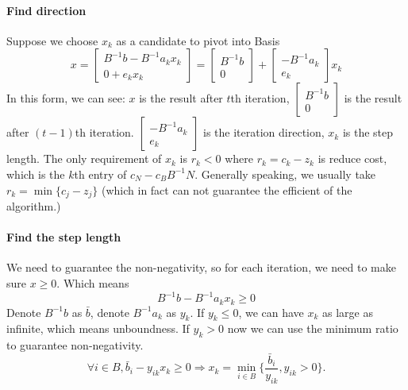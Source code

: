             \paragraph{Find direction}
                Suppose we choose $x_k$ as a candidate to pivot into Basis\\
                \begin{equation}
                    x = \left[ \begin{matrix}B^{-1}b-B^{-1}a_kx_k \\ 0+e_kx_k\end{matrix}\right]=\left[ \begin{matrix}B^{-1}b \\ 0\end{matrix} \right] + \left[ \begin{matrix} -B^{-1}a_k \\ e_k \end{matrix} \right]x_k \nonumber
                \end{equation}
                In this form, we can see: $x$ is the result after $t$th iteration, $\left[ \begin{matrix}B^{-1}b \\ 0\end{matrix} \right]$ is the result after $(t-1)$th iteration. $ \left[ \begin{matrix} -B^{-1}a_k \\ e_k \end{matrix} \right]$ is the iteration direction, $x_k$ is the step length. The only requirement of $x_k$ is $r_k < 0$ where $r_k=c_k - z_k$ is reduce cost, which is the $k$th entry of $c_N - c_BB^{-1}N$. Generally speaking, we usually take $r_k = \min\{c_j - z_j\}$ (which in fact can not guarantee the efficient of the algorithm.)

            \paragraph{Find the step length}
                We need to guarantee the non-negativity, so for each iteration, we need to make sure $x\ge 0$. Which means
                \begin{equation}
                    B^{-1}b-B^{-1}a_kx_k \ge 0 \nonumber 
                \end{equation}
                Denote $B^{-1}b$ as $\bar{b}$, denote $B^{-1}a_k$ as $y_k$. If $y_k \le 0$, we can have $x_k$ as large as infinite, which means unboundness. If $y_k > 0$ now we can use the minimum ratio to guarantee non-negativity.
                \begin{equation}
                    \forall i \in B, \bar{b}_i - y_{ik} x_k \ge 0 \Rightarrow x_k = \min_{i \in B} \{\frac{\bar{b}_i}{y_{ik}}, y_{ik} > 0\}.\nonumber
                \end{equation}

